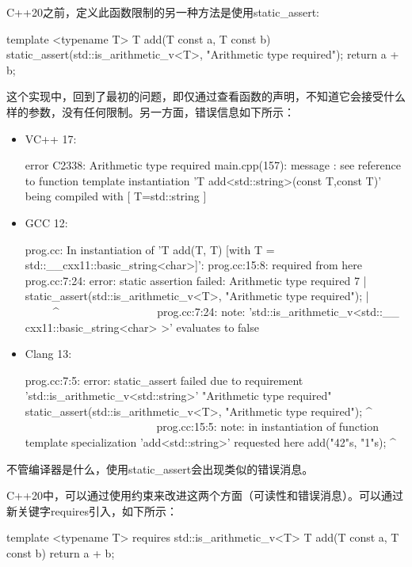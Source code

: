 C++20之前，定义此函数限制的另一种方法是使用static_assert:

\begin{cppcode}
template <typename T>
T add(T const a, T const b)
{
	static_assert(std::is_arithmetic_v<T>,
				  "Arithmetic type required");
	return a + b;
}
\end{cppcode}

这个实现中，回到了最初的问题，即仅通过查看函数的声明，不知道它会接受什么样的参数，没有任何限制。另一方面，错误信息如下所示：

\begin{itemize}
  \item VC++ 17:

\begin{shell}
error C2338: Arithmetic type required
main.cpp(157): message : see reference to function
template instantiation 'T add<std::string>(const T,const
T)' being compiled
     with
     [
         T=std::string
     ]
\end{shell}
  \item GCC 12:

\begin{shell}
prog.cc: In instantiation of 'T add(T, T) [with T =
std::__cxx11::basic_string<char>]':
prog.cc:15:8: required from here
prog.cc:7:24: error: static assertion failed: Arithmetic
type required
    7 | static_assert(std::is_arithmetic_v<T>,
"Arithmetic type required");
      |                         ~~~~~^~~~~~~~~~~~~~~~~~
prog.cc:7:24: note: 'std::is_arithmetic_v<std::__
cxx11::basic_string<char> >' evaluates to false
\end{shell}
  \item Clang 13:

\begin{shell}
prog.cc:7:5: error: static_assert failed due to
requirement 'std::is_arithmetic_v<std::string>'
"Arithmetic type required"
     static_assert(std::is_arithmetic_v<T>, "Arithmetic
type required");
     ^ ~~~~~~~~~~~~~~~~~~~~~~~
prog.cc:15:5: note: in instantiation of function template
specialization 'add<std::string>' requested here
    add("42"s, "1"s);
    ^
\end{shell}
\end{itemize}

不管编译器是什么，使用static_assert会出现类似的错误消息。

C++20中，可以通过使用约束来改进这两个方面（可读性和错误消息）。可以通过新关键字requires引入，如下所示：

\begin{cppcode}
template <typename T>
requires std::is_arithmetic_v<T>
T add(T const a, T const b)
{
	return a + b;
}
\end{cppcode}

